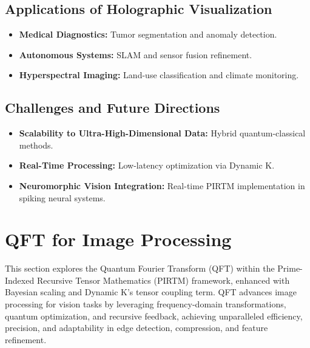\documentclass{article}
\theoremstyle{plain}
\begin{document}
\subsection{Applications of Holographic Visualization}
\begin{itemize}
    \item \textbf{Medical Diagnostics:} Tumor segmentation and anomaly detection.
    \item \textbf{Autonomous Systems:} SLAM and sensor fusion refinement.
    \item \textbf{Hyperspectral Imaging:} Land-use classification and climate monitoring.
\end{itemize}

\subsection{Challenges and Future Directions}
\begin{itemize}
    \item \textbf{Scalability to Ultra-High-Dimensional Data:} Hybrid quantum-classical methods.
    \item \textbf{Real-Time Processing:} Low-latency optimization via Dynamic K.
    \item \textbf{Neuromorphic Vision Integration:} Real-time PIRTM implementation in spiking neural systems.
\end{itemize}


\section{QFT for Image Processing}
This section explores the Quantum Fourier Transform (QFT) within the Prime-Indexed Recursive Tensor Mathematics (PIRTM) framework, enhanced with Bayesian scaling and Dynamic K’s tensor coupling term. QFT advances image processing for vision tasks by leveraging frequency-domain transformations, quantum optimization, and recursive feedback, achieving unparalleled efficiency, precision, and adaptability in edge detection, compression, and feature refinement.
\end{document}

